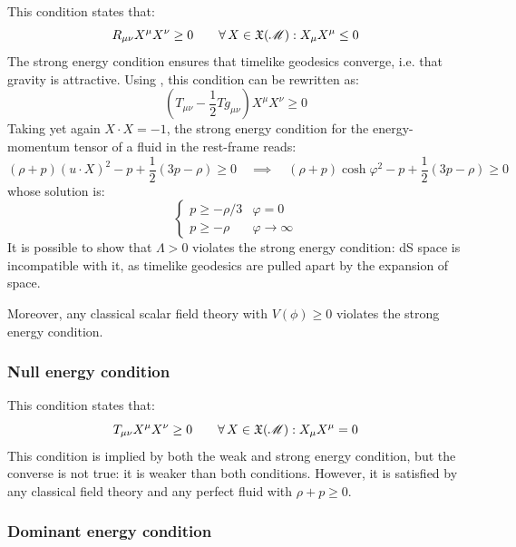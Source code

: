 This condition states that:
\begin{equation}
  R_{\mu \nu} X^\mu X^\nu \ge 0
  \qquad
  \forall\, X \in \mathfrak{X}(\mathscr{M}) : X_\mu X^\mu \le 0
\end{equation}
The strong energy condition ensures that timelike geodesics converge, i.e. that gravity is attractive. Using , this condition can be rewritten as:
\begin{equation*}
  \left( T_{\mu \nu} - \frac{1}{2} T g_{\mu \nu} \right) X^\mu X^\nu \ge 0
\end{equation*}
Taking yet again $ X \cdot X = -1 $, the strong energy condition for the energy-momentum tensor of a fluid  in the rest-frame reads:
\begin{equation*}
  (\rho + p) (u \cdot X)^2 - p + \frac{1}{2} (3p - \rho) \ge 0
  \quad \implies \quad
  (\rho + p) \cosh \varphi^2 - p + \frac{1}{2} (3p - \rho) \ge 0
\end{equation*}
whose solution is:
\begin{equation*}
  \begin{cases}
    p \ge -\rho/3 & \varphi = 0 \\
    p \ge -\rho & \varphi \rightarrow \infty
  \end{cases}
\end{equation*}
It is possible to show that $ \Lambda > 0 $ violates the strong energy condition: dS space is incompatible with it, as timelike geodesics are pulled apart by the expansion of space.

Moreover, any classical scalar field theory with $ V(\phi) \ge 0 $ violates the strong energy condition.

\subsubsection{Null energy condition}

This condition states that:
\begin{equation}
  T_{\mu \nu} X^\mu X^\nu \ge 0
  \qquad
  \forall\, X \in \mathfrak{X}(\mathscr{M}) : X_\mu X^\mu = 0
\end{equation}
This condition is implied by both the weak and strong energy condition, but the converse is not true: it is weaker than both conditions. However, it is satisfied by any classical field theory and any perfect fluid with $ \rho + p \ge 0 $.

\subsubsection{Dominant energy condition}

